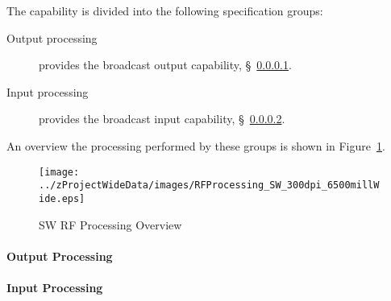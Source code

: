 The \ThisSys \ThisSegment \SW capability is divided into the following specification groups:
\begin{description}
	\item[Output processing] provides the \SW broadcast output capability, \S~\ref{loc:RF_SW_Output}.
	\item[Input processing]  provides the \SW broadcast input  capability, \S~\ref{loc:RF_SW_Input}.
\end{description}
An overview the processing performed by these groups is shown in Figure~\ref{fig:SW_RF_Processing}.
\begin{figure}[htbp]
	\centering
		\texttt{[image: ../zProjectWideData/images/RFProcessing\_SW\_300dpi\_6500millWide.eps]}
	\caption[SW RF Processing Overview]{SW RF Processing Overview}
	\label{fig:SW_RF_Processing}
\end{figure}

\KNEADPARAGRAPHNEWPAGE
\paragraph{\SW \RF Output Processing}
\label{loc:RF_SW_Output}
\renewcommand{\ThisSubSegment}{\SW \RF Output Processing\xspace}%


\KNEADPARAGRAPHNEWPAGE
\paragraph{\SW \RF Input Processing}
\label{loc:RF_SW_Input}
\renewcommand{\ThisSubSegment}{\SW \RF Input Processing\xspace}%

